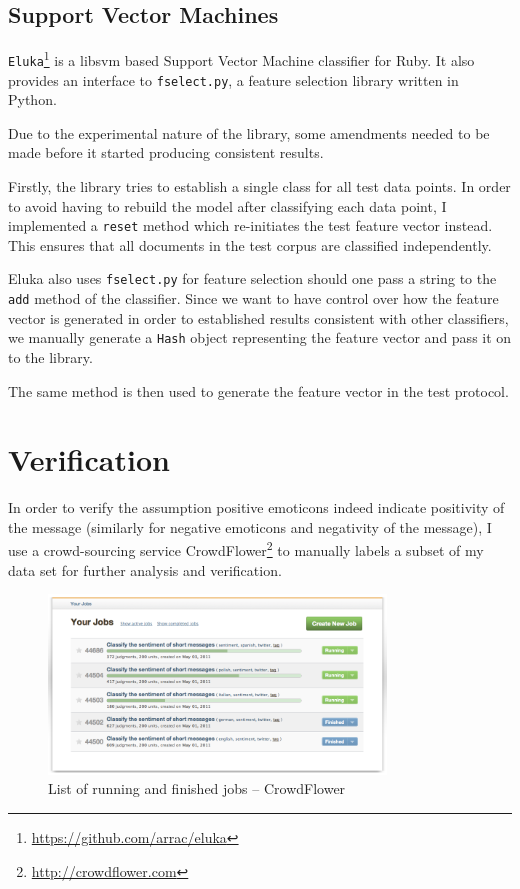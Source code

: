 \subsection{Support Vector Machines}

\verb|Eluka|\footnote{\url{https://github.com/arrac/eluka}} is a libsvm based Support Vector Machine classifier for Ruby. It also provides an interface to \verb|fselect.py|, a feature selection library written in Python.

Due to the experimental nature of the library, some amendments needed to be made before it started producing consistent results.

Firstly, the library tries to establish a single class for all test data points. In order to avoid having to rebuild the model after classifying each data point, I implemented a \verb|reset| method which re-initiates the test feature vector instead. This ensures that all documents in the test corpus are classified independently.

Eluka also uses \verb|fselect.py| for feature selection should one pass a string to the \verb|add| method of the classifier. Since we want to have control over how the feature vector is generated in order to established results consistent with other classifiers, we manually generate a \verb|Hash| object representing the feature vector and pass it on to the library.

The same method is then used to generate the feature vector in the test protocol.

\section{Verification}

In order to verify the assumption positive emoticons indeed indicate positivity of the message (similarly for negative emoticons and negativity of the message), I use a crowd-sourcing service CrowdFlower\footnote{\url{http://crowdflower.com}} to manually labels a subset of my data set for further analysis and verification.

\begin{figure}[htb]
  \begin{center}
    \includegraphics[width=0.8\textwidth]{crowdflower-jobs.png}
    \caption{List of running and finished jobs -- CrowdFlower}
    \label{fig:crowdflower-jobs}
  \end{center}
\end{figure}

